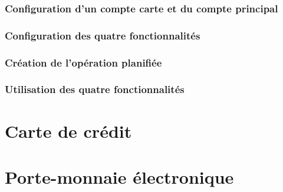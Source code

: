 \subsubsection{Configuration d'un compte carte et du compte principal}

\subsubsection{Configuration des quatre fonctionnalités}


\subsubsection{Création de l'opération planifiée}


\subsubsection{Utilisation des quatre fonctionnalités}

 
\section{Carte de crédit\label{bankcard-creditCard}}


\section{Porte-monnaie électronique\label{bankcard-purse}}
 


